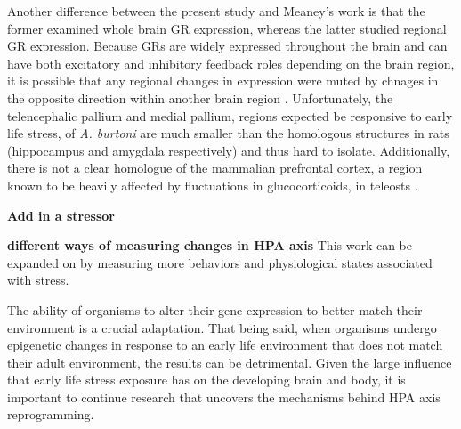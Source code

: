 \documentclass[12pt,twoside]{reedthesis}
\begin{document}
Another difference between the present study and Meaney's work is that the
former examined whole brain GR expression, whereas the latter studied regional
GR expression. Because GRs are widely expressed throughout the brain and can
have both excitatory and inhibitory feedback roles depending on the brain
region, it is possible that any regional changes in expression were muted by
chnages in the opposite direction within another brain region \citep{2017Nrid,
  herman_limbic_2005}. Unfortunately, the telencephalic pallium and medial
pallium, regions expected be responsive to early life stress, of
\textit{A. burtoni} are much smaller than the homologous structures in rats
(hippocampus and amygdala respectively) and thus hard to isolate. Additionally,
there is not a clear homologue of the mammalian prefrontal cortex, a region
known to be heavily affected by fluctuations in glucocorticoids, in teleosts
\citep{lupien_effects_2009, yamamoto_studies_2009}. 

\textbf{Add in a stressor}

\textbf{different ways of measuring changes in HPA axis}
This work can be expanded on by measuring more behaviors and physiological
states associated with stress. 

The ability of organisms to alter their gene expression to better match their environment is a crucial adaptation.
That being said, when organisms undergo epigenetic changes in response to an
early life environment that does not match their adult environment, the results
can be detrimental. Given the large influence that early life stress exposure has on the developing
brain and body, it is important to continue research that uncovers the
mechanisms behind HPA axis reprogramming.


\end{document}
